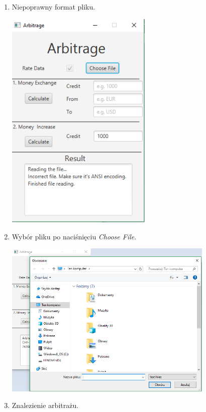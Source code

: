 \documentclass[a4paper,11pt]{article}
\begin{document}
\begin{enumerate}
\begin{center}
\end{center}
\item Niepoprawny format pliku.
\begin{center}
\includegraphics[width = 7cm]{badPlik}
\end{center}
\item Wybór pliku po naciśnięciu \textit{Choose File}.
\begin{center}
\includegraphics[width = 10cm]{filechooser}
\end{center}
\item Znalezienie arbitrażu.
\begin{center}

\end{center}
\end{enumerate}
\end{document}
